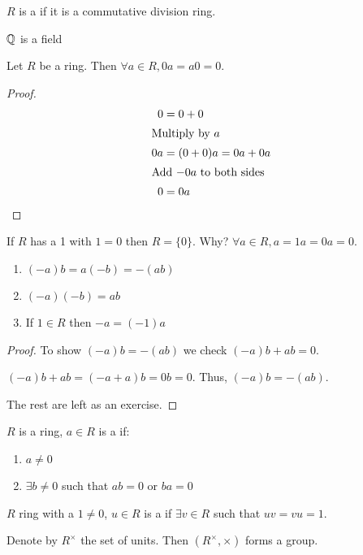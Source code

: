 \documentclass[notes.tex]{subfiles}
\begin{document}
\begin{defn}
	$R$ is a  if it is a commutative division ring.
\end{defn}
\begin{eg}
	$\mathbb{Q}$ is a field
\end{eg}

\begin{proposition}
	Let $R$ be a ring. Then $\forall a\in R, 0a = a0 = 0.$
\end{proposition}
\begin{proof}\leavevmode
\begin{align*}
	0 &= 0+ 0\\
	\shortintertext{Multiply by $a$}
	0a &= (0+0)a = 0a + 0a\\
	\shortintertext{Add $-0a$ to both sides}
	0 &= 0a\qedhere
\end{align*}
\end{proof}

\begin{remark}
	If $R$ has a 1 with $1=0$ then $R = \{0\}$. Why? $\forall a\in R, a = 1a = 0a = 0$.
\end{remark}

\begin{proposition}\leavevmode
\begin{enumerate}
	\item $(-a)b = a(-b) = -(ab)$
	\item $(-a)(-b) = ab$
	\item If $1\in R$ then $-a = (-1)a$
\end{enumerate}
\end{proposition}
\begin{proof}
	To show $(-a)b = -(ab)$
	we check $(-a)b + ab = 0$.

	$(-a)b + ab = (-a + a)b = 0b = 0$. Thus, $(-a)b = -(ab)$.

	The rest are left as an exercise.
\end{proof}

\begin{defn}
	$R$ is a ring, $a\in R$ is a  if:
	\begin{enumerate}
		\item $a\ne 0$
		\item $\exists b\ne 0$ such that $ab = 0$ or $ba = 0$
	\end{enumerate}
\end{defn}

\begin{defn}
	$R$ ring with a $1\ne 0$, $u\in R$ is a  if $\exists v\in R$ such that $uv = vu = 1$.
\end{defn}
\begin{remark}
	Denote by $R^\times$ the set of units. Then $(R^\times, \times)$ forms a group.
\end{remark}
\end{document}
